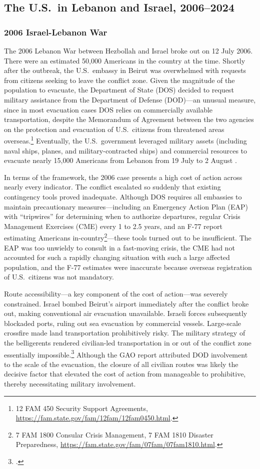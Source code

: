 \documentclass[12pt]{article}
\begin{document}
\subsection{The U.S.\ in Lebanon and Israel, 2006--2024}

\subsubsection{2006 Israel-Lebanon War}

The 2006 Lebanon War between Hezbollah and Israel broke out on 12 July 2006. There were an estimated 50,000 Americans in the country at the time. Shortly after the outbreak, the U.S.\ embassy in Beirut was overwhelmed with requests from citizens seeking to leave the conflict zone. Given the magnitude of the population to evacuate, the Department of State (DOS) decided to request military assistance from the Department of Defense (DOD)---an unusual measure, since in most evacuation cases DOS relies on commercially available transportation, despite the Memorandum of Agreement between the two agencies on the protection and evacuation of U.S.\ citizens from threatened areas overseas.\footnote{12 FAM 450 Security Support Agreements, \url{https://fam.state.gov/fam/12fam/12fam0450.html}.} Eventually, the U.S.\ government leveraged military assets (including naval ships, planes, and military-contracted ships) and commercial resources to evacuate nearly 15,000 Americans from Lebanon from 19 July to 2 August \citep{GAO2007}.

In terms of the framework, the 2006 case presents a high cost of action across nearly every indicator. The conflict escalated so suddenly that existing contingency tools proved inadequate. Although DOS requires all embassies to maintain precautionary measures---including an Emergency Action Plan (EAP) with ``tripwires'' for determining when to authorize departures, regular Crisis Management Exercises (CME) every 1 to 2.5 years, and an F-77 report estimating Americans in-country\footnote{7 FAM 1800 Consular Crisis Management, 7 FAM 1810 Disaster Preparedness, \url{https://fam.state.gov/fam/07fam/07fam1810.html}.}---these tools turned out to be insufficient. The EAP was too unwieldy to consult in a fast-moving crisis, the CME had not accounted for such a rapidly changing situation with such a large affected population, and the F-77 estimates were inaccurate because overseas registration of U.S.\ citizens was not mandatory.

Route accessibility---a key component of the cost of action---was severely constrained. Israel bombed Beirut's airport immediately after the conflict broke out, making conventional air evacuation unavailable. Israeli forces subsequently blockaded ports, ruling out sea evacuation by commercial vessels. Large-scale crossfire made land transportation prohibitively risky. The military strategy of the belligerents rendered civilian-led transportation in or out of the conflict zone essentially impossible.\footnote{\citet{McGreal2006}.} Although the GAO report attributed DOD involvement to the scale of the evacuation, the closure of all civilian routes was likely the decisive factor that elevated the cost of action from manageable to prohibitive, thereby necessitating military involvement.
\end{document}
